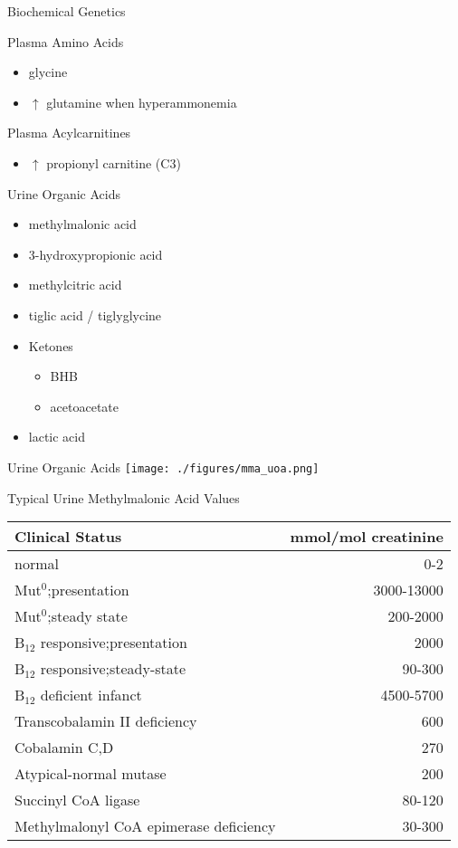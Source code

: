 \documentclass[presentation, smaller]{beamer}
\begin{document}
\begin{frame}[label={sec:orgheadline14}]{Biochemical Genetics}
\begin{block}{Plasma Amino Acids}
\begin{itemize}
\item \textpm{} glycine
\item \(\uparrow\) glutamine when hyperammonemia
\end{itemize}
\end{block}
\begin{block}{Plasma Acylcarnitines}
\begin{itemize}
\item \(\uparrow\) propionyl carnitine (C3)
\end{itemize}
\end{block}
\begin{block}{Urine Organic Acids}
\begin{itemize}
\item methylmalonic acid
\item 3-hydroxypropionic acid
\item methylcitric acid
\item tiglic acid / tiglyglycine
\item Ketones
\begin{itemize}
\item BHB
\item acetoacetate
\end{itemize}
\item lactic acid
\end{itemize}
\end{block}
\end{frame}

\begin{frame}[label={sec:orgheadline15}]{Urine Organic Acids}
\texttt{[image: ./figures/mma\_uoa.png]}
\end{frame}

\begin{frame}[label={sec:orgheadline16}]{Typical Urine Methylmalonic Acid Values}
\begin{center}
\begin{tabular}{lr}
Clinical Status & mmol/mol creatinine\\
\hline
normal & 0-2\\
Mut\(^{\text{0}}\);presentation & 3000-13000\\
Mut\(^{\text{0}}\);steady state & 200-2000\\
B\(_{\text{12}}\) responsive;presentation & 2000\\
B\(_{\text{12}}\) responsive;steady-state & 90-300\\
B\(_{\text{12}}\) deficient infanct & 4500-5700\\
Transcobalamin II deficiency & 600\\
Cobalamin C,D & 270\\
Atypical-normal mutase & 200\\
Succinyl CoA ligase & 80-120\\
Methylmalonyl CoA epimerase deficiency & 30-300\\
\end{tabular}
\end{center}
\end{frame}
\end{document}
